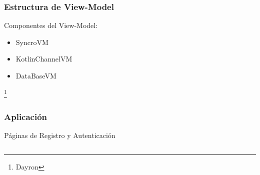 \documentclass[14pt]{beamer}
\begin{document}
\begin{frame}
\frametitle{Estructura de View-Model}
Componentes del View-Model:
\begin{itemize}
\item SyncroVM
\item KotlinChannelVM
\item DataBaseVM


\end{itemize}

\footnote{Dayron}
\end{frame}


\begin{frame}
\frametitle{Aplicación}
Páginas de Registro y Autenticación
\begin{columns}
\begin{column}{0.25\textwidth}
\begin{center}


\end{center}
\end{column}
\end{columns}
\end{frame}
\end{document}
